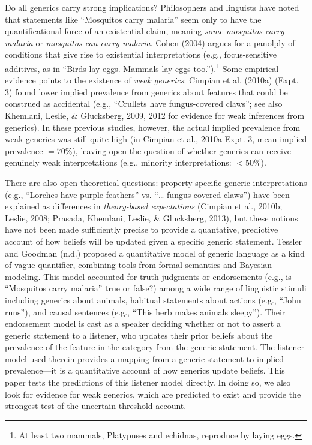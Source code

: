 \documentclass[,man,floatsintext]{apa6}
\let\rmarkdownfootnote\footnote%
\def\footnote{\protect\rmarkdownfootnote}
\theoremstyle{definition}
\theoremstyle{definition}
\theoremstyle{definition}
\theoremstyle{remark}
\begin{document}
Do all generics carry strong implications? Philosophers and linguists
have noted that statements like \enquote{Mosquitos carry malaria} seem
only to have the quantificational force of an existential claim, meaning
\emph{some mosquitos carry malaria} or \emph{mosquitos can carry
malaria}. Cohen (2004) argues for a panolply of conditions that give
rise to existential interpretations (e.g., focus-sensitive additives, as
in \enquote{Birds lay eggs. Mammals lay eggs too.}).\footnote{At least
  two mammals, Platypuses and echidnas, reproduce by laying eggs.} Some
empirical evidence points to the existence of \emph{weak generics}:
Cimpian et al. (2010a) (Expt. 3) found lower implied prevalence from
generics about features that could be construed as accidental (e.g.,
``Crullets have fungus-covered claws''; see also Khemlani, Leslie, \&
Glucksberg, 2009, 2012 for evidence for weak inferences from generics).
In these previous studies, however, the actual implied prevalence from
weak generics was still quite high (in Cimpian et al., 2010a Expt. 3,
mean implied prevalence \(= 70\%\)), leaving open the question of
whether generics can receive genuinely weak interpretations (e.g.,
minority interpretations: \(< 50\%\)).

There are also open theoretical questions: property-specific generic
interpretations (e.g., \enquote{Lorches have purple feathers} vs.
\enquote{\ldots{} fungus-covered claws}) have been explained as
differences in \emph{theory-based expectations} (Cimpian et al., 2010b;
Leslie, 2008; Prasada, Khemlani, Leslie, \& Glucksberg, 2013), but these
notions have not been made sufficiently precise to provide a quantative,
predictive account of how beliefs will be updated given a specific
generic statement. Tessler and Goodman (n.d.) proposed a quantitative
model of generic language as a kind of vague quantifier, combining tools
from formal semantics and Bayesian modeling. This model accounted for
truth judgments or endorsements (e.g., is \enquote{Mosquitos carry
malaria} true or false?) among a wide range of linguistic stimuli
including generics about animals, habitual statements about actions
(e.g., \enquote{John runs}), and causal sentences (e.g., \enquote{This
herb makes animals sleepy}). Their endorsement model is cast as a
speaker deciding whether or not to assert a generic statement to a
listener, who updates their prior beliefs about the prevalence of the
feature in the category from the generic statement. The listener model
used therein provides a mapping from a generic statement to implied
prevalence---it is a quantitative account of how generics update
beliefs. This paper tests the predictions of this listener model
directly. In doing so, we also look for evidence for weak generics,
which are predicted to exist and provide the strongest test of the
uncertain threshold account.
\end{document}
